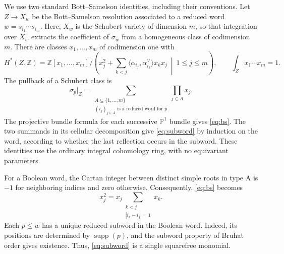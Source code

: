 \documentclass[11pt]{article}
\newcommand{\supp}{\operatorname{supp}}
\begin{document}
We use two standard Bott--Samelson identities, including their conventions. Let $Z\to X_w$ be the Bott--Samelson resolution associated to a reduced word $w=s_{i_1}\cdots s_{i_m}$. Here, $X_w$ is the Schubert variety of dimension $m$, so that integration over $X_w$ extracts the coefficient of $\sigma_w$ from a homogeneous class of codimension $m$. There are classes $x_1,\ldots,x_m$ of codimension one with
\begin{equation}\label{eq:bs}
 H^*(Z,\mathbb Z)=
 \mathbb Z[x_1,\ldots,x_m]\Big/
 \left(x_j^2+\sum_{k<j}\langle\alpha_{i_j},\alpha_{i_k}^{\vee}\rangle x_kx_j
          \ \middle|\ 1\leq j\leq m\right),
 \qquad \int_Zx_1\cdots x_m=1.
\end{equation}
The pullback of a Schubert class is
\begin{equation}\label{eq:subword}
 \sigma_p\big|_Z=
 \sum_{\substack{A\subseteq\{1,\ldots,m\}\\
           (i_j)_{j\in A}\text{ is a reduced word for }p}}
       \prod_{j\in A}x_j.
\end{equation}
The projective bundle formula for each successive $\mathbb P^1$ bundle gives \eqref{eq:bs}. The two summands in its cellular decomposition give \eqref{eq:subword} by induction on the word, according to whether the last reflection occurs in the subword. These identities use the ordinary integral cohomology ring, with no equivariant parameters.

For a Boolean word, the Cartan integer between distinct simple roots in type A is $-1$ for neighboring indices and zero otherwise. Consequently, \eqref{eq:bs} becomes
\begin{equation}\label{eq:pathring}
 x_j^2=x_j\sum_{\substack{k<j\\ |i_k-i_j|=1}}x_k.
\end{equation}
Each $p\leq w$ has a unique reduced subword in the Boolean word. Indeed, its positions are determined by $\supp(p)$, and the subword property of Bruhat order gives existence. Thus, \eqref{eq:subword} is a single squarefree monomial.
\end{document}

